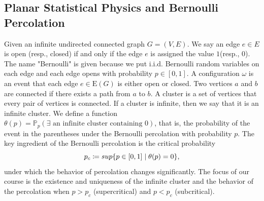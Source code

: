 \documentclass[12pt]{article}
\theoremstyle{plane}
\theoremstyle{definition}
\begin{document}
\subsection{Planar Statistical Physics and Bernoulli Percolation}
Given an infinite undirected connected graph $G = (V,E)$. We say an edge $e \in E$ is open (resp., closed) if and only if the edge $e$ is assigned the value $1$(resp., $0$). The name "Bernoulli" is given because we put i.i.d. Bernoulli random variables on each edge and each edge opens with probability $p\in[0,1]$. A configuration $\omega$ is an event that each edge $e\in \text{E}(G)$ is either open or closed. Two vertices $a$ and $b$ are connected if there exists a path from $a$ to $b$. A cluster is a set of vertices that every pair of vertices is connected. If a cluster is infinite, then we say that it is an infinite cluster. We define a function $\theta(p)=\mathbb{P}_p(\exists\text{ an infinite cluster containing }0)$, that is, the probability of the event in the parentheses under the Bernoulli percolation with probability $p$. The key ingredient of the Bernoulli percolation is the critical probability \[p_c\coloneqq\\sup\{p\in [0,1]\mid \theta(p)=0\},\] under which the behavior of percolation changes significantly. The focus of our course is the existence and uniqueness of the infinite cluster and the behavior of the percolation when $p>p_c$ (supercritical) and $p<p_c$ (subcritical). 

\end{document}
